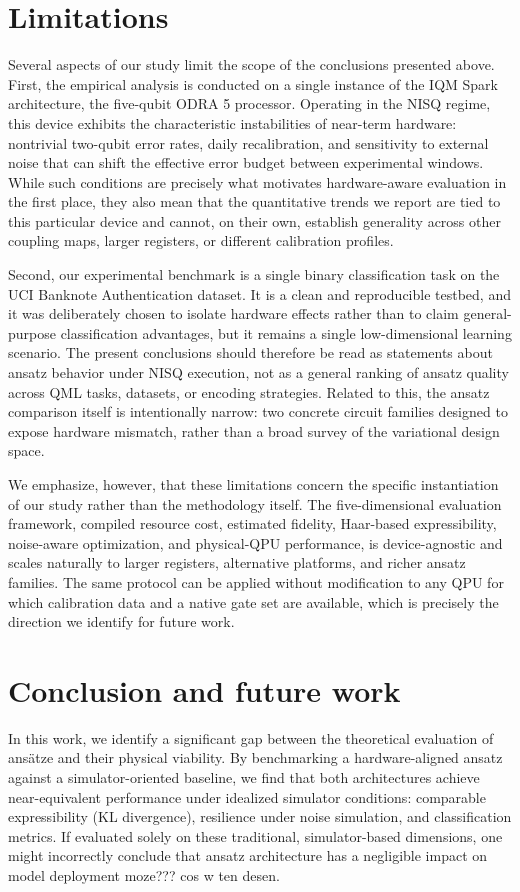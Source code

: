 \documentclass[11pt]{article}
\begin{document}
\section{Limitations}

Several aspects of our study limit the scope of the conclusions presented above. First, the empirical analysis is conducted on a single instance of the IQM Spark architecture, the five-qubit ODRA 5 processor. Operating in the NISQ regime, this device exhibits the characteristic instabilities of near-term hardware: nontrivial two-qubit error rates, daily recalibration, and sensitivity to external noise that can shift the effective error budget between experimental windows. While such conditions are precisely what motivates hardware-aware evaluation in the first place, they also mean that the quantitative trends we report are tied to this particular device and cannot, on their own, establish generality across other coupling maps, larger registers, or different calibration profiles.

Second, our experimental benchmark is a single binary classification task on the UCI Banknote Authentication dataset. It is a clean and reproducible testbed, and it was deliberately chosen to isolate hardware effects rather than to claim general-purpose classification advantages, but it remains a single low-dimensional learning scenario. The present conclusions should therefore be read as statements about ansatz behavior under NISQ execution, not as a general ranking of ansatz quality across QML tasks, datasets, or encoding strategies. Related to this, the ansatz comparison itself is intentionally narrow: two concrete circuit families designed to expose hardware mismatch, rather than a broad survey of the variational design space.

We emphasize, however, that these limitations concern the specific instantiation of our study rather than the methodology itself. The five-dimensional evaluation framework, compiled resource cost, estimated fidelity, Haar-based expressibility, noise-aware optimization, and physical-QPU performance, is device-agnostic and scales naturally to larger registers, alternative platforms, and richer ansatz families. The same protocol can be applied without modification to any QPU for which calibration data and a native gate set are available, which is precisely the direction we identify for future work.

\section{Conclusion and future work}
In this work, we identify a significant gap between the theoretical evaluation of ansätze and their physical viability. By benchmarking a hardware-aligned ansatz against a simulator-oriented baseline, we find that both architectures achieve near-equivalent performance under idealized simulator conditions: comparable expressibility (KL divergence), resilience under noise simulation, and classification metrics. If evaluated solely on these traditional, simulator-based dimensions, one might incorrectly conclude that ansatz architecture has a negligible impact on model {deployment moze??? cos w ten desen}. 
\end{document}
